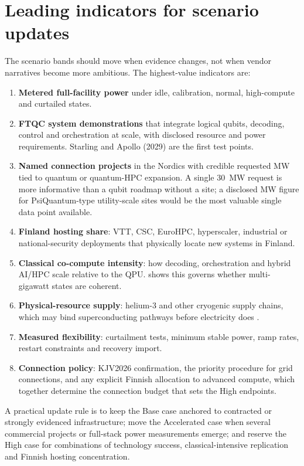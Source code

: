 \documentclass[11pt,a4paper]{article}
\begin{document}
\section{Leading indicators for scenario updates}
The scenario bands should move when evidence changes, not when vendor narratives become more ambitious. The highest-value indicators are:
\begin{enumerate}
  \item \textbf{Metered full-facility power} under idle, calibration, normal, high-compute and curtailed states.
  \item \textbf{FTQC system demonstrations} that integrate logical qubits, decoding, control and orchestration at scale, with disclosed resource and power requirements. Starling and Apollo (2029) are the first test points.
  \item \textbf{Named connection projects} in the Nordics with credible requested MW tied to quantum or quantum-HPC expansion. A single 30~MW request is more informative than a qubit roadmap without a site; a disclosed MW figure for PsiQuantum-type utility-scale sites would be the most valuable single data point available.
  \item \textbf{Finland hosting share}: VTT, CSC, EuroHPC, hyperscaler, industrial or national-security deployments that physically locate new systems in Finland.
  \item \textbf{Classical co-compute intensity}: how decoding, orchestration and hybrid AI/HPC scale relative to the QPU.  shows this governs whether multi-gigawatt states are coherent.
  \item \textbf{Physical-resource supply}: helium-3 and other cryogenic supply chains, which may bind superconducting pathways before electricity does \citep{mccollum2026futures}.
  \item \textbf{Measured flexibility}: curtailment tests, minimum stable power, ramp rates, restart constraints and recovery import.
  \item \textbf{Connection policy}: KJV2026 confirmation, the priority procedure for grid connections, and any explicit Finnish allocation to advanced compute, which together determine the connection budget that sets the High endpoints.
\end{enumerate}
A practical update rule is to keep the Base case anchored to contracted or strongly evidenced infrastructure; move the Accelerated case when several commercial projects or full-stack power measurements emerge; and reserve the High case for combinations of technology success, classical-intensive replication and Finnish hosting concentration.
\end{document}
